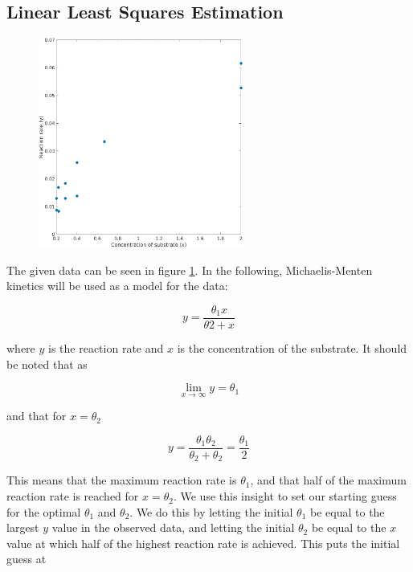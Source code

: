 \subsection{Linear Least Squares Estimation}

\begin{figure}[htb]
\centering
\includegraphics[width=0.6\textwidth]{../img/2-1raw}
\caption{}
\label{fig:2-1raw}
\end{figure}

The given data can be seen in figure \ref{fig:2-1raw}. In the following, Michaelis-Menten kinetics will be used as a model for the data:

\begin{equation}
y = \frac{\theta_1 x}{\theta2 + x}
\end{equation}

where $y$ is the reaction rate and $x$ is the concentration of the substrate. It should be noted that as

\begin{equation}
\lim_{x \rightarrow \infty} y = \theta_1
\label{limitEQ}
\end{equation}

and that for $x=\theta_2$

\begin{equation}
y = \frac{\theta_1 \theta_2}{\theta_2 + \theta_2} = \frac{\theta_1}{2}
\label{starting_guessEQ}
\end{equation}

This means that the maximum reaction rate is $\theta_1$, and that half of the maximum reaction rate is reached for $x = \theta_2$. We use this insight to set our starting guess for the optimal $\theta_1$ and $\theta_2$. We do this by letting the initial $\theta_1$ be equal to the largest $y$ value in the observed data, and letting the initial $\theta_2$ be equal to the $x$ value at which half of the highest reaction rate is achieved. This puts the initial guess at

